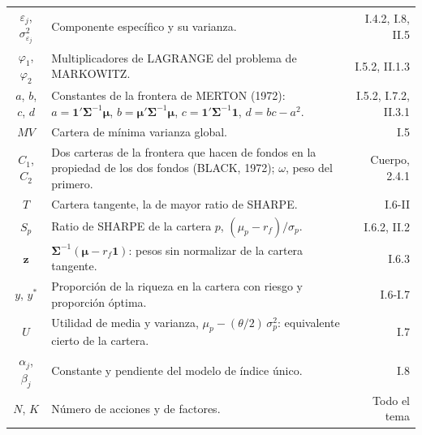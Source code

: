 \documentclass[10pt,a4paper]{article}
\begin{document}
\begin{longtable}{SMD}
$\varepsilon_j$, $\sigma_{\varepsilon_j}^2$ & Componente específico y su varianza. & I.4.2, I.8, II.5\\
$\varphi_1$, $\varphi_2$ & Multiplicadores de LAGRANGE del problema de MARKOWITZ. & I.5.2, II.1.3\\
$a$, $b$, $c$, $d$ & Constantes de la frontera de MERTON (1972): $a=\mathbf 1'\boldsymbol\Sigma^{-1}\boldsymbol\mu$, $b=\boldsymbol\mu'\boldsymbol\Sigma^{-1}\boldsymbol\mu$, $c=\mathbf 1'\boldsymbol\Sigma^{-1}\mathbf 1$, $d=bc-a^2$. & I.5.2, I.7.2, II.3.1\\
$MV$ & Cartera de mínima varianza global. & I.5\\
$C_1$, $C_2$ & Dos carteras de la frontera que hacen de fondos en la propiedad de los dos fondos (BLACK, 1972); $\omega$, peso del primero. & Cuerpo, 2.4.1\\
$T$ & Cartera tangente, la de mayor ratio de SHARPE. & I.6-II\\
$S_p$ & Ratio de SHARPE de la cartera $p$, $(\mu_p-r_f)/\sigma_p$. & I.6.2, II.2\\
$\mathbf z$ & $\boldsymbol\Sigma^{-1}(\boldsymbol\mu-r_f\mathbf 1)$: pesos sin normalizar de la cartera tangente. & I.6.3\\
$y$, $y^*$ & Proporción de la riqueza en la cartera con riesgo y proporción óptima. & I.6-I.7\\
$U$ & Utilidad de media y varianza, $\mu_p-(\theta/2)\,\sigma_p^2$: equivalente cierto de la cartera. & I.7\\
$\alpha_j$, $\beta_j$ & Constante y pendiente del modelo de índice único. & I.8\\
$N$, $K$ & Número de acciones y de factores. & Todo el tema\\
\end{longtable}
\end{document}
